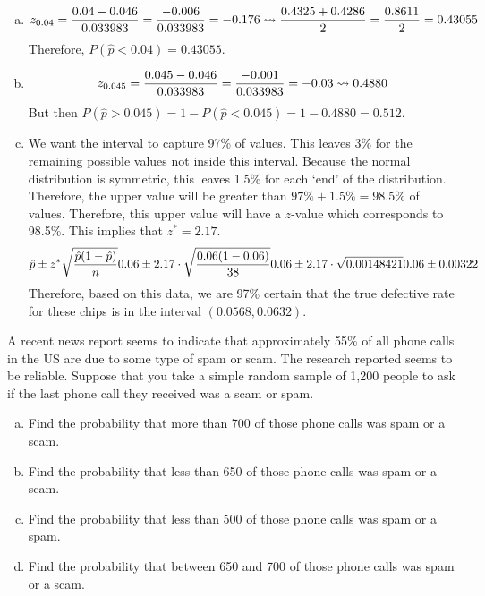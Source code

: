 \documentclass[11pt,letterpaper]{article}
\begin{document}
\begin{enumerate}[(a)]
\item 
	\[
	z_{0.04}= \dfrac{0.04 - 0.046}{0.033983}= \dfrac{-0.006}{0.033983}= -0.176 \rightsquigarrow \dfrac{0.4325 + 0.4286}{2}= \dfrac{0.8611}{2}= 0.43055 
	\] 
Therefore, $P(\hat{p} < 0.04)= 0.43055$. \pspace

\item 
	\[
	z_{0.045}= \dfrac{0.045 - 0.046}{0.033983}= \dfrac{-0.001}{0.033983}= -0.03 \rightsquigarrow 0.4880
	\] 
But then $P(\hat{p} > 0.045)= 1 - P(\hat{p} < 0.045)= 1 - 0.4880= 0.512$. \pspace

\item We want the interval to capture 97\% of values. This leaves 3\% for the remaining possible values not inside this interval. Because the normal distribution is symmetric, this leaves 1.5\% for each `end' of the distribution. Therefore, the upper value will be greater than $97\% + 1.5\%= 98.5\%$ of values. Therefore, this upper value will have a $z$-value which corresponds to 98.5\%. This implies that $z^*= 2.17$. 
	\[
	\hat{p} \pm z^* \sqrt{\dfrac{\hat{p} (1 - \hat{p})}{n}} \\
	0.06 \pm 2.17 \cdot \sqrt{\dfrac{0.06 (1 - 0.06)}{38}} \\
	0.06 \pm 2.17 \cdot \sqrt{0.00148421} \\
	0.06 \pm 0.00322 
	\]
Therefore, based on this data, we are 97\% certain that the true defective rate for these chips is in the interval $(0.0568, 0.0632)$. 
\end{enumerate}



\newpage



 A recent news report seems to indicate that approximately 55\% of all phone calls in the US are due to some type of spam or scam. The research reported seems to be reliable. Suppose that you take a simple random sample of 1,200 people to ask if the last phone call they received was a scam or spam. 
	\begin{enumerate}[(a)]
	\item Find the probability that more than 700 of those phone calls was spam or a scam. 
	\item Find the probability that less than 650 of those phone calls was spam or a scam.
	\item Find the probability that less than 500 of those phone calls was spam or a spam.
	\item Find the probability that between 650 and 700 of those phone calls was spam or a scam.  
	\end{enumerate} \pspace
\end{document}
